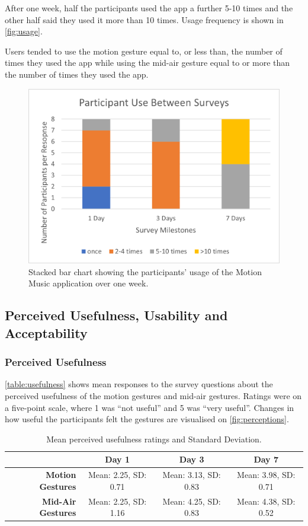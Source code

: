 \documentclass{l4proj}
\begin{document}
After one week, half the participants used the app a further 5-10 times and the other half said they used it more than 10 times. Usage frequency is shown in \autoref{fig:usage}.

Users tended to use the motion gesture equal to, or less than, the number of times they used the app while using the mid-air gesture equal to or more than the number of times they used the app.

\begin{figure}[h!]
    \centering
    \includegraphics[width=\textwidth]{images/Stacked Use.png}
        \caption{Stacked bar chart showing the participants' usage of the Motion Music application over one week.}
        \label{fig:usage}
\end{figure}

\subsection{Perceived Usefulness, Usability and Acceptability}

\subsubsection{Perceived Usefulness}

\autoref{table:usefulness} shows mean responses to the survey questions about the perceived usefulness of the motion gestures and mid-air gestures. Ratings were on a five-point scale, where 1 was ``not useful'' and 5 was ``very useful''. Changes in how useful the participants felt the gestures are visualised on \autoref{fig:perceptions}. 

\begin{table}[h!]
\centering
\begin{tabular}{r c c c}
                              & \textbf{Day 1} & \textbf{Day 3} & \textbf{Day 7} \\ \toprule
    \textbf{Motion Gestures}  & Mean: 2.25, SD: 0.71   & Mean: 3.13, SD: 0.83    & Mean: 3.98, SD: 0.71  \\
    \textbf{Mid-Air Gestures} & Mean: 2.25, SD: 1.16   & Mean: 4.25, SD: 0.83    & Mean: 4.38, SD: 0.52 \\ \bottomrule
\end{tabular}
\caption{Mean perceived usefulness ratings and Standard Deviation.}
\label{table:usefulness}
\end{table}
\end{document}
